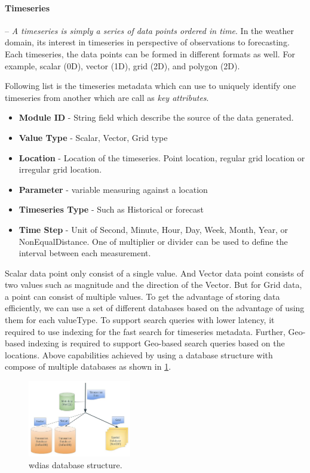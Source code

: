 \documentclass[conference]{IEEEtran}
\begin{document}
\paragraph{Timeseries}-- \emph{A timeseries is simply a series of data points ordered in time}. In the weather domain, its interest in timeseries in perspective of observations to forecasting. Each timeseries, the data points can be formed in different formats as well. For example, scalar (0D), vector (1D), grid (2D), and polygon (2D).

Following list is the timeseries metadata which can use to uniquely identify one timeseries from another which are call as \emph{key attributes}.

\begin{itemize}
    \item \textbf{Module ID} -  String field which describe the source of the data generated.
    \item \textbf{Value Type} -  Scalar, Vector, Grid type
    \item \textbf{Location} - Location of the timeseries. Point location, regular grid location or irregular grid location.
    \item \textbf{Parameter} - variable measuring against a location
    \item \textbf{Timeseries Type} - Such as Historical or forecast
    \item \textbf{Time Step} - Unit of Second, Minute, Hour, Day, Week, Month, Year, or NonEqualDistance. One of multiplier or divider can be used to define the interval between each measurement.
\end{itemize}

Scalar data point only consist of a single value. And Vector data point consists of two values such as magnitude and the direction of the Vector. But for Grid data, a point can consist of multiple values. To get the advantage of storing data efficiently, we can use a set of different databases based on the advantage of using them for each valueType. To support search queries with lower latency, it required to use indexing for the fast search for timeseries metadata. Further, Geo-based indexing is required to support Geo-based search queries based on the locations. Above capabilities achieved by using a database structure with compose of multiple databases as shown in \cref{pfi:database_structure}.

\begin{figure}[htbp]
\centerline{\includegraphics[width=0.4\textwidth]{method/microservice/wdias_database_structure.jpg}}
\caption{\acrshort{wdias} database structure.}
\label{pfi:database_structure}
\end{figure}
\end{document}
